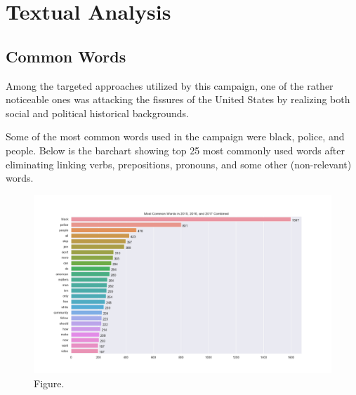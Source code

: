 \documentclass[11pt]{article}
\theoremstyle{definition}
\begin{document}

\section*{\centering Textual Analysis}

\subsection*{\centering Common Words}

Among the targeted approaches utilized by this campaign, one of the rather
noticeable ones was attacking the fissures of the United States by realizing
both social and political historical backgrounds.

\bigskip

Some of the most common words used in the campaign were black, police, and
people. Below is the barchart showing top 25 most commonly used words after
eliminating linking verbs, prepositions, pronouns, and some other
(non-relevant) words.

\begin{figure}[H]
\centering
\includegraphics[width=\textwidth]{../visualization/barchart-plots/barchart_word_counts.png}
\caption*{Figure.}
\end{figure}

\end{document}
